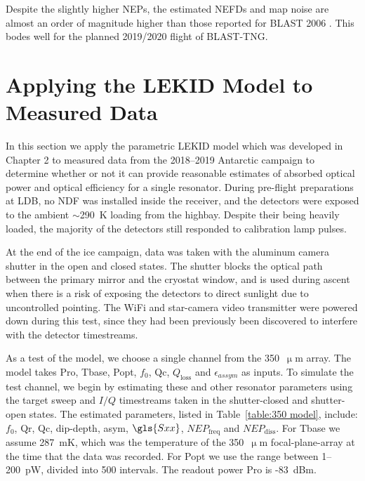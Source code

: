 Despite the slightly higher NEPs, the estimated NEFDs and map noise are almost an order of magnitude higher than those reported for BLAST 2006 \citep{marsden2009blast}. This bodes well for the planned 2019/2020 flight of BLAST-TNG\@.

\section{Applying the LEKID Model to Measured Data}\label{applying model}

In this section we apply the parametric LEKID model which was developed in Chapter 2 to measured data from the 2018--2019 Antarctic campaign to determine whether or not it can provide reasonable estimates of absorbed optical power and optical efficiency for a single resonator. During pre-flight preparations at LDB, no NDF was installed inside the receiver, and the detectors were exposed to the ambient $\sim$290~K loading from the highbay. Despite their being heavily loaded, the majority of the detectors still responded to calibration lamp pulses.

At the end of the ice campaign, data was taken with the aluminum camera shutter in the open and closed states. The shutter blocks the optical path between the primary mirror and the cryostat window, and is used during ascent when there is a risk of exposing the detectors to direct sunlight due to uncontrolled pointing. The WiFi and star-camera video transmitter were powered down during this test, since they had been previously been discovered to interfere with the detector timestreams.

As a test of the model, we choose a single channel from the 350~$\upmu$m array. The model takes \gls{Pro}, \gls{Tbase}, \gls{Popt}, $f_{0}$, \gls{Qc}, $Q_{\mathrm{loss}}$ and $\epsilon_{assym}$ as inputs. To simulate the test channel, we begin by estimating these and other resonator parameters using the target sweep and $I/Q$ timestreams taken in the shutter-closed and shutter-open states. The estimated parameters, listed in Table~\ref{table:350 model}, include: $f_{0}$, \gls{Qr}, \gls{Qc}, dip-depth, \gls{asym}, $\gls{Sxx}$, $NEP_{\mathrm{freq}}$ and $NEP_{\mathrm{diss}}$. For \gls{Tbase} we assume 287~mK, which was the temperature of the 350~$\upmu$m focal-plane-array at the time that the data was recorded. For \gls{Popt} we use the range between 1--200~pW, divided into 500 intervals. The readout power \gls{Pro} is -83~dBm.


